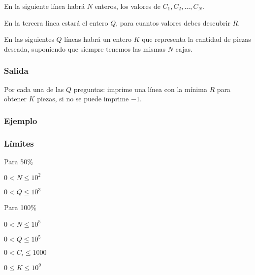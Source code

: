 En la siguiente línea habrá \(N\) enteros, los valores de \(C_1, C_2, \ldots, C_N\).

En la tercera línea estará el entero \(Q\), para cuantos valores debes descubrir \(R\).

En las siguientes \(Q\) líneas habrá un entero \(K\) que representa la cantidad de piezas deseada, suponiendo que siempre tenemos las mismas \(N\) cajas.

\subsubsection*{Salida}

Por cada una de las \(Q\) preguntas: imprime una línea con la mínima \(R\) para obtener \(K\) piezas, si no se puede imprime \(-1\).

\subsubsection*{Ejemplo}

\begin{casebox3}
\end{casebox3}
\subsubsection*{Límites}
\begin{plimits}
	\item Para 50\%
	\begin{plimits}
		\item \(0< N \leq 10^2\)
		\item \(0< Q \leq 10^3\)
	\end{plimits}
	\item Para 100\%
	\begin{plimits}
		\item \(0< N \leq 10^5\)
		\item \(0< Q \leq 10^5\)
		\item \(0< C_i \leq 1000\)
		\item \(0\leq K \leq 10^9\)
	\end{plimits}
\end{plimits}

